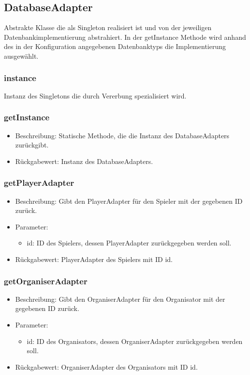 \documentclass[a4paper]{scrreprt}
\begin{document}
	\subsection{DatabaseAdapter}
	Abstrakte Klasse die als Singleton realisiert ist und von der jeweiligen Datenbankimplementierung abstrahiert.
	In der getInstance Methode wird anhand des in der Konfiguration angegebenen Datenbanktyps die Implementierung ausgewählt.

	\subsubsection{instance}
	Instanz des Singletons die durch Vererbung spezialisiert wird.

	\subsubsection{getInstance}
	\begin{itemize}
		\item Beschreibung: Statische Methode, die die Instanz des DatabaseAdapters zurückgibt.
		\item Rückgabewert: Instanz des DatabaseAdapters.
	\end{itemize}

	\subsubsection{getPlayerAdapter}
	\begin{itemize}
		\item Beschreibung: Gibt den PlayerAdapter für den Spieler mit der gegebenen ID zurück.
		\item Parameter:
		\begin{itemize}
			\item id: ID des Spielers, dessen PlayerAdapter zurückgegeben werden soll.
		\end{itemize}
		\item Rückgabewert: PlayerAdapter des Spielers mit ID id.
	\end{itemize}

	\subsubsection{getOrganiserAdapter}
	\begin{itemize}
		\item Beschreibung: Gibt den OrganiserAdapter für den Organisator mit der gegebenen ID zurück.
		\item Parameter:
		\begin{itemize}
			\item id: ID des Organisators, dessen OrganiserAdapter zurückgegeben werden soll.
		\end{itemize}
		\item Rückgabewert: OrganiserAdapter des Organisators mit ID id.
	\end{itemize}
\end{document}
